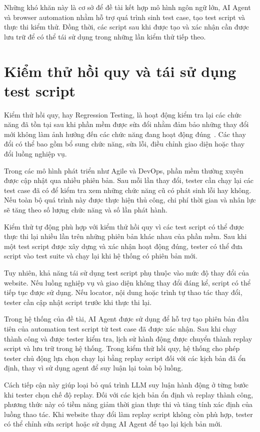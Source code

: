 Những khó khăn này là cơ sở để đề tài kết hợp mô hình ngôn ngữ lớn, AI Agent và browser automation nhằm hỗ trợ quá trình sinh test case, tạo test script và thực thi kiểm thử. Đồng thời, các script sau khi được tạo và xác nhận cần được lưu trữ để có thể tái sử dụng trong những lần kiểm thử tiếp theo.

\section{Kiểm thử hồi quy và tái sử dụng test script}

Kiểm thử hồi quy, hay Regression Testing, là hoạt động kiểm tra lại các chức năng đã tồn tại sau khi phần mềm được sửa đổi nhằm đảm bảo những thay đổi mới không làm ảnh hưởng đến các chức năng đang hoạt động đúng~\cite{istqb_ctfl_v4}. Các thay đổi có thể bao gồm bổ sung chức năng, sửa lỗi, điều chỉnh giao diện hoặc thay đổi luồng nghiệp vụ.

Trong các mô hình phát triển như Agile và DevOps, phần mềm thường xuyên được cập nhật qua nhiều phiên bản. Sau mỗi lần thay đổi, tester cần chạy lại các test case đã có để kiểm tra xem những chức năng cũ có phát sinh lỗi hay không. Nếu toàn bộ quá trình này được thực hiện thủ công, chi phí thời gian và nhân lực sẽ tăng theo số lượng chức năng và số lần phát hành.

Kiểm thử tự động phù hợp với kiểm thử hồi quy vì các test script có thể được thực thi lại nhiều lần trên những phiên bản khác nhau của phần mềm. Sau khi một test script được xây dựng và xác nhận hoạt động đúng, tester có thể đưa script vào test suite và chạy lại khi hệ thống có phiên bản mới.

Tuy nhiên, khả năng tái sử dụng test script phụ thuộc vào mức độ thay đổi của website. Nếu luồng nghiệp vụ và giao diện không thay đổi đáng kể, script có thể tiếp tục được sử dụng. Nếu locator, nội dung hoặc trình tự thao tác thay đổi, tester cần cập nhật script trước khi thực thi lại.

Trong hệ thống của đề tài, AI Agent được sử dụng để hỗ trợ tạo phiên bản đầu tiên của automation test script từ test case đã được xác nhận. Sau khi chạy thành công và được tester kiểm tra, lịch sử hành động được chuyển thành replay script và lưu trữ trong hệ thống. Trong kiểm thử hồi quy, hệ thống cho phép tester chủ động lựa chọn chạy lại bằng replay script đối với các kịch bản đã ổn định, thay vì sử dụng agent để suy luận lại toàn bộ luồng.

Cách tiếp cận này giúp loại bỏ quá trình LLM suy luận hành động ở từng bước khi tester chọn chế độ replay. Đối với các kịch bản ổn định và replay thành công, phương thức này có tiềm năng giảm thời gian thực thi và tăng tính xác định của luồng thao tác. Khi website thay đổi làm replay script không còn phù hợp, tester có thể chỉnh sửa script hoặc sử dụng AI Agent để tạo lại kịch bản mới.

